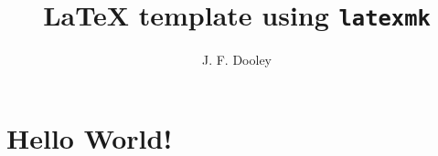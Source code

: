 \documentclass[12pt]{article}
\author{J. F. Dooley}
\title{\LaTeX{} template using \texttt{latexmk}}
\begin{document}
\maketitle

\section{Hello World!}
\lipsum[1-2]%
~\cite{LaTeX2020,Kerrisk2010}



\end{document}
